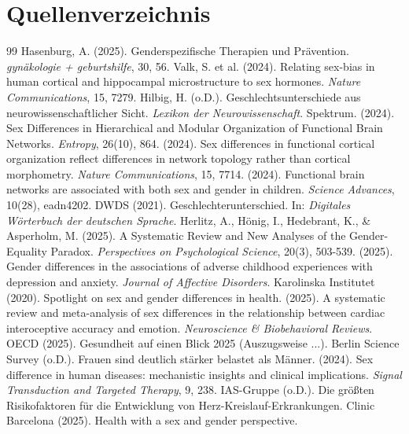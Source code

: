 \documentclass[12pt,a4paper]{article}
\begin{document}
	\section{Quellenverzeichnis}
	
	\begin{thebibliography}{99}
		 Hasenburg, A. (2025). Genderspezifische Therapien und Prävention. \textit{gynäkologie + geburtshilfe}, 30, 56.
		 Valk, S. et al. (2024). Relating sex-bias in human cortical and hippocampal microstructure to sex hormones. \textit{Nature Communications}, 15, 7279.
		 Hilbig, H. (o.D.). Geschlechtsunterschiede aus neurowissenschaftlicher Sicht. \textit{Lexikon der Neurowissenschaft}. Spektrum.
		 (2024). Sex Differences in Hierarchical and Modular Organization of Functional Brain Networks. \textit{Entropy}, 26(10), 864.
		 (2024). Sex differences in functional cortical organization reflect differences in network topology rather than cortical morphometry. \textit{Nature Communications}, 15, 7714.
		 (2024). Functional brain networks are associated with both sex and gender in children. \textit{Science Advances}, 10(28), eadn4202.
		 DWDS (2021). Geschlechterunterschied. In: \textit{Digitales Wörterbuch der deutschen Sprache}.
		 Herlitz, A., Hönig, I., Hedebrant, K., \& Asperholm, M. (2025). A Systematic Review and New Analyses of the Gender-Equality Paradox. \textit{Perspectives on Psychological Science}, 20(3), 503-539.
		 (2025). Gender differences in the associations of adverse childhood experiences with depression and anxiety. \textit{Journal of Affective Disorders}.
		 Karolinska Institutet (2020). Spotlight on sex and gender differences in health.
		 (2025). A systematic review and meta-analysis of sex differences in the relationship between cardiac interoceptive accuracy and emotion. \textit{Neuroscience \& Biobehavioral Reviews}.
		 OECD (2025). Gesundheit auf einen Blick 2025 (Auszugsweise ...).
		 Berlin Science Survey (o.D.). Frauen sind deutlich stärker belastet als Männer.
		 (2024). Sex difference in human diseases: mechanistic insights and clinical implications. \textit{Signal Transduction and Targeted Therapy}, 9, 238.
		 IAS-Gruppe (o.D.). Die größten Risikofaktoren für die Entwicklung von Herz-Kreislauf-Erkrankungen.
		 Clinic Barcelona (2025). Health with a sex and gender perspective.

\end{thebibliography}
\end{document}
